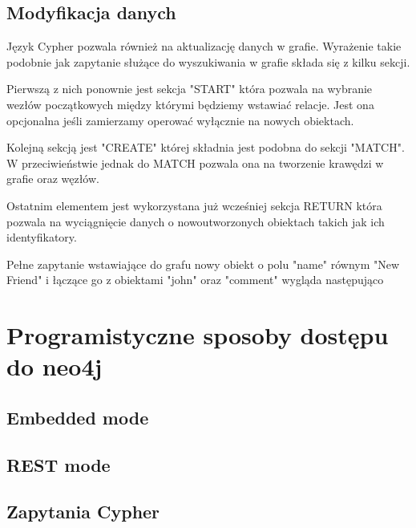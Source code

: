 \documentclass[brudnopis]{xmgr}
\begin{document}


\subsection{Modyfikacja danych}

Język Cypher pozwala również na aktualizację danych w grafie. Wyrażenie takie podobnie jak zapytanie służące do wyszukiwania w grafie składa się z kilku sekcji.

Pierwszą z nich ponownie jest sekcja "START" która pozwala na wybranie wezłów początkowych między którymi będziemy wstawiać relacje. Jest ona opcjonalna jeśli zamierzamy operować wyłącznie na nowych obiektach.



Kolejną sekcją jest "CREATE" której składnia jest podobna do sekcji "MATCH". W przeciwieństwie jednak do MATCH pozwala ona na tworzenie krawędzi w grafie oraz węzłów.



Ostatnim elementem jest wykorzystana już wcześniej sekcja RETURN która pozwala na wyciągnięcie danych o nowoutworzonych obiektach takich jak ich identyfikatory.



Pełne zapytanie wstawiające do grafu nowy obiekt o polu "name" równym "New Friend" i łączące go z obiektami "john" oraz "comment" wygląda następująco



\section{Programistyczne sposoby dostępu do neo4j}

\subsection{Embedded mode}

\subsection{REST mode}

\subsection{Zapytania Cypher}
\end{document}
